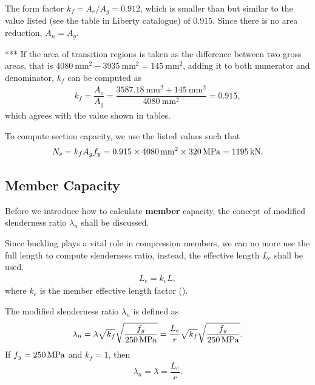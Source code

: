 \begin{solution}
The form factor $k_f=A_e/A_g=0.912$, which is smaller than but similar to the value listed (see the table in Liberty catalogue) of $0.915$. Since there is no area reduction, $A_n=A_g$.

*** If the area of transition regions is taken as the difference between two gross areas, that is $\SI{4080}{\mm^2}-\SI{3935}{\mm^2}=\SI{145}{\mm^2}$, adding it to both numerator and denominator, $k_f$ can be computed as
\begin{gather*}
k_f=\dfrac{A_e}{A_g}=\dfrac{\SI{3587.18}{\mm^2}+\SI{145}{\mm^2}}{\SI{4080}{\mm^2}}=0.915,
\end{gather*}
which agrees with the value shown in tables.

To compute section capacity, we use the listed values such that
\begin{gather*}
N_s=k_fA_gf_y=0.915\times\SI{4080}{\milli\meter^2}\times\SI{320}{\mega\pascal}=\SI{1195}{\kilo\newton}.
\end{gather*}
\end{solution}
\subsection{Member Capacity}\label{sec:n_c}
Before we introduce how to calculate \textbf{member} capacity, the concept of modified slenderness ratio $\lambda_n$ shall be discussed.

Since buckling plays a vital role in compression members, we can no more use the full length to compute slenderness ratio, instead, the effective length $L_e$ shall be used.
\begin{gather}
L_e=k_eL,
\end{gather}
where $k_e$ is the member effective length factor ().

The modified slenderness ratio $\lambda_n$ is defined as
\begin{gather}
\lambda_n=\lambda\sqrt{k_f}\sqrt{\dfrac{f_y}{\SI{250}{\mega\pascal}}}=\dfrac{L_e}{r}\sqrt{k_f}\sqrt{\dfrac{f_y}{\SI{250}{\mega\pascal}}}.
\end{gather}
If $f_y=\SI{250}{\mega\pascal}$ and $k_f=1$, then
\begin{gather*}
\lambda_n=\lambda=\dfrac{L_e}{r}.
\end{gather*}

